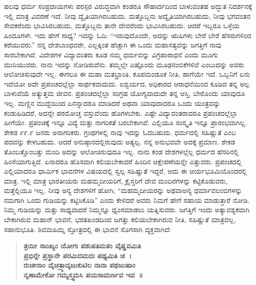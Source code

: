 ಹಲವು ಧರ್ಮ ಸಂಪ್ರದಾಯಗಳು ಪರಸ್ಪರ ವಿರುದ್ಧವಾಗಿ ಕಂಡರೂ ಸೌಹಾರ್ದದಿಂದ ಬಾಳುವಂತಹ ಅದ್ಭುತ ನಿದರ್ಶನಕ್ಕೆ ಇಲ್ಲಿ ಮಾತ್ರ ವಿವರಣೆ ಇದೆ. ನೀವು ದ್ವೈತಿಯಾಗಿರ\-ಬಹುದು. ಮತ್ತೊಬ್ಬನು ಅದ್ವೈತಿಯಾಗಿರಬಹುದು, ನೀವು ಭಗವಂತನ ಸೇವಕರೆಂದು ಭಾವಿಸಿರಬಹುದು, ಮತ್ತೊಬ್ಬನು ತಾನೇ ದೇವರೆಂದು ಭಾವಿಸಿರಬಹುದು. ಆದರೆ ಇಬ್ಬರೂ ಒಳ್ಳೆಯ ಹಿಂದೂಗಳೇ. ಇದು ಹೇಗೆ ಸಾಧ್ಯ? ಇದನ್ನು ಓದಿ: “ಇರುವುದೊಂದೇ, ಅದನ್ನು ಋಷಿಗಳು ಬೇರೆ ಬೇರೆ ಹೆಸರುಗಳಿಂದ ಕರೆಯುವರು.” ನನ್ನ ದೇಶಬಾಂಧವರೇ, ಎಲ್ಲಕ್ಕಿಂತ ಹೆಚ್ಚಾಗಿ ಈ ಒಂದು ಮಹಾಸತ್ಯವನ್ನು ಜಗತ್ತಿಗೆ ನಾವು ಸಾರಬೇಕಾಗಿದೆ. ವಿದೇಶಗಳ ವಿದ್ಯಾವಂತರು ಕೂಡ ನಮ್ಮ ಧರ್ಮವನ್ನು ವಿಗ್ರಹಾರಾಧನೆ ಎಂದು ಮೂಗು ಮುರಿಯುವರು. ನಾನು ಇದನ್ನು ನೋಡಿರುವೆನು. ತಮ್ಮಲ್ಲೇ ಎಷ್ಟೊಂದು ಮೂಢನಂಬಿಕೆಗಳಿವೆ ಎಂಬುದನ್ನು ಅವರು ಆಲೋಚಿಸುವುದೇ ಇಲ್ಲ. ಈಗಲೂ ಈ ಮಹಾ ಮತಭ್ರಾಂತಿ, ಕೂಪಮಂಡೂಕ ನೀತಿ, ಹಾಗೆಯೇ ಇದೆ. ಒಬ್ಬನಿಗೆ ಏನು ಇದೆಯೋ ಅದೇ ಪ್ರಪಂಚದಲ್ಲೆಲ್ಲಾ ಸಾರ್ಥಕವಾದುದು. ಐಶ್ವರ್ಯದ, ಅಧಿಕಾರದ ಆರಾಧನೆಯಿಂದ ಕೂಡಿದ ತನ್ನ ಅಲ್ಪ ಬಾಳುವೆಯೆ ಅತ್ಯುತ್ತಮ ಜೀವನ. ಪ್ರಪಂಚದಲ್ಲೆಲ್ಲಾ ಸಂಗ್ರಹ ಯೋಗ್ಯವಾದುದೇ ತನ್ನ ಆಸ್ತಿ, ಬೇರೊಂದು ಯಾವುದೂ ಇಲ್ಲ. ಮಣ್ಣಿನ ಮುದ್ದೆಯಿಂದ ಏನನ್ನಾದರೂ ಮಾಡಿದರೆ ಅಥವಾ ಯಾವುದಾದರೂ ಒಂದು ಯಂತ್ರವನ್ನು ಕಂಡುಹಿಡಿದರೆ, ಅದನ್ನೇ ಪರಮೋಚ್ಚ ವಸ್ತುವೆಂದು ಹೊಗಳಬೇಕು. ಎಷ್ಟೇ ವಿದ್ಯಾವಂತರಾದರೂ ಪ್ರಪಂಚದಲ್ಲೆಲ್ಲಾ ಹೀಗೆಯೇ. ಪ್ರಪಂಚಕ್ಕೆ ಇನ್ನೂ ವಿದ್ಯೆ ಮತ್ತು ನಾಗರಿಕತೆ ಬರಬೇಕಾಗಿವೆ. ಎಲ್ಲಿಯೂ ಸಂಸ್ಕೃತಿ ಇನ್ನೂ ಪ್ರಾರಂಭವಾಗಿಲ್ಲ. ಶೇಕಡ ೯೯.೯ ಜನರು ಅನಾಗರಿಕರು. ಗ್ರಂಥಗಳಲ್ಲಿ ನಾವು ಇದನ್ನು ಓದಬಹುದು. ಧರ್ಮದಲ್ಲಿ ಸಹಿಷ್ಣುತೆ ಎಂಬ ಪದವನ್ನು ಕೇಳಬಹುದು. ಆದರೆ ಅನುಷ್ಠಾನದಲ್ಲಿರುವುದು ಅತ್ಯಲ್ಪ. ನನ್ನ ಅನುಭವವೇ ಅದಕ್ಕೆ ಪ್ರಮಾಣ. ಶೇಕಡ ತೊಂಬತ್ತೊಂಬತ್ತು ಮಂದಿ ಅದನ್ನು ಆಲೋಚಿಸುವುದೂ ಇಲ್ಲ. ನಾನು ಕಂಡ ದೇಶಗಳಲ್ಲೆಲ್ಲ ಧರ್ಮದ ಹೆಸರಿನಲ್ಲಿ ಹಿಂಸೆಯಾಗುತ್ತಿದೆ. ಏನಾದರೂ ಹೊಸದಾಗಿ ಕಲಿಯಬೇಕಾದರೆ ಹಿಂದಿನ ಆಕ್ಷೇಪಣೆಯನ್ನೇ ಎತ್ತುವರು. ಪ್ರಪಂಚದಲ್ಲಿ ಎಲ್ಲಿಯಾದರೂ ಧಾರ್ಮಿಕ ಭಾವನೆಗಳ ವಿಷಯದಲ್ಲಿ ಸ್ವಲ್ಪ ಸಹಿಷ್ಣುತೆ ಇದ್ದರೆ, ಅದು ಈ ಆರ್ಯಭೂಮಿಯೊಂದರಲ್ಲಿ ಮಾತ್ರ. ಇಲ್ಲಿ ಮಾತ್ರ ಭಾರತೀಯರು ಮಹಮ್ಮದೀಯರಿಗೆ, ಕ್ರೈಸ್ತರಿಗೆ ದೇವ ಮಂದಿರಗಳನ್ನು ಕಟ್ಟಿಕೊಡುವರು, ಮತ್ತೆಲ್ಲಿಯೂ ಇಲ್ಲ. ನೀವು ಅನ್ಯ ದೇಶಗಳಿಗೆ ಹೋಗಿ; “ಮಹಮ್ಮದೀಯರನ್ನು ಅಥವಾ\break ಅನ್ಯ ಧರ್ಮಾವಲಂಬಿಗಳನ್ನು ನಮಗಾಗಿ ಒಂದು ಗುಡಿಯನ್ನು ಕಟ್ಟಿಸಿಕೊಡಿ” ಎಂದು ಕೇಳಿದರೆ ಅವರು ನಿಮಗೆ ಹೇಗೆ ಸಹಾಯ ಮಾಡುತ್ತಾರೆ ನೋಡಿ. ನಿಮ್ಮ ಗುಡಿಯನ್ನು ಮತ್ತು ಸಾಧ್ಯವಾದರೆ ನಿಮ್ಮನ್ನೂ ಧ್ವಂಸಮಾಡಲು ಯತ್ನಿಸುವರು. ಜಗತ್ತಿಗೆ ಇಂದು ಅತ್ಯಾವಶ್ಯಕವಾಗಿ ಬೇಕಾಗಿರುವ ಮಹಾನ್ ಭಾವನೆ, ಭರತಖಂಡದಿಂದ ಜಗತ್ತು ಕಲಿಯಬೇಕಾಗಿರುವ ನೀತಿ, ಸಹಿಷ್ಣುತೆ ಮಾತ್ರವಲ್ಲ, ಸಹಾನುಭೂತಿ. ಶಿವಮಹಿಮ್ನ ಸ್ತೋತ್ರದಲ್ಲಿ ಈ ಭಾವನೆ ಸೊಗಸಾಗಿ ವ್ಯಕ್ತವಾಗಿದೆ:

\begin{verse}
\textbf{ತ್ರಯೀ ಸಾಂಖ್ಯಂ ಯೋಗಃ ಪಶುಪತಿಮತಂ ವೈಷ್ಣವಮಿತಿ}\\\textbf{ಪ್ರಭಿನ್ನೇ ಪ್ರಸ್ಥಾನೇ ಪರಮಿದಮದಃ ಪಥ್ಯಮಿತಿ ಚ~।}\\\textbf{ರುಚೀನಾಂ ವೈಚಿತ್ರ್ಯಾದೃಜುಕುಟಿಲ ನಾನಾ ಪಥಜುಷಾಂ}\\\textbf{ನೃಣಾಮೇಕೋ ಗಮ್ಯಸ್ತ್ವಮಸಿ ಪಯಸಾಮರ್ಣವ ಇವ~॥}
\end{verse}

